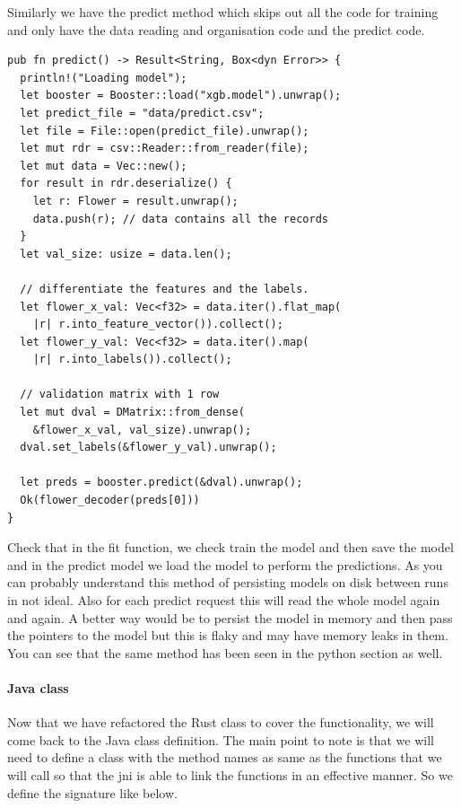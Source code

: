 \documentclass{book}
\begin{document}
Similarly we have the predict method which skips out all the code for training and only have the data reading and organisation code and the predict code.

\begin{lstlisting}[caption={chapter8/iris\_classification\_xgboost/iris\_classification\_library/src/lib.rs}, basicstyle=\small]
pub fn predict() -> Result<String, Box<dyn Error>> {
  println!("Loading model");
  let booster = Booster::load("xgb.model").unwrap();
  let predict_file = "data/predict.csv";
  let file = File::open(predict_file).unwrap();
  let mut rdr = csv::Reader::from_reader(file);
  let mut data = Vec::new();
  for result in rdr.deserialize() {
    let r: Flower = result.unwrap();
    data.push(r); // data contains all the records
  }
  let val_size: usize = data.len();

  // differentiate the features and the labels.
  let flower_x_val: Vec<f32> = data.iter().flat_map(
    |r| r.into_feature_vector()).collect();
  let flower_y_val: Vec<f32> = data.iter().map(
    |r| r.into_labels()).collect();

  // validation matrix with 1 row
  let mut dval = DMatrix::from_dense(
    &flower_x_val, val_size).unwrap();
  dval.set_labels(&flower_y_val).unwrap();

  let preds = booster.predict(&dval).unwrap();
  Ok(flower_decoder(preds[0]))
}
\end{lstlisting}

Check that in the fit function, we check train the model and then save the model and in the predict model we load the model to perform the predictions. As you can probably understand this method of persisting models on disk between runs in not ideal. Also for each predict request this will read the whole model again and again. A better way would be to persist the model in memory and then pass the pointers to the model but this is flaky and may have memory leaks in them. You can see that the same method has been seen in the python section as well.
\label{par:rust_functionality}

\paragraph{Java class}%
Now that we have refactored the Rust class to cover the functionality, we will come back to the Java class definition. The main point to note is that we will need to define a class with the method names as same as the functions that we will call so that the jni is able to link the functions in an effective manner. So we define the signature like below.
\end{document}
